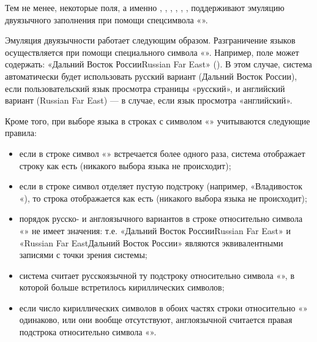 \documentclass[letterpaper,10pt,russian]{sphinxmanual}
\begin{document}
Тем не менее, некоторые поля, а именно {\hyperref[\detokenize{main:id23}]{}}, {\hyperref[\detokenize{main:id24}]{}}, {\hyperref[\detokenize{main:id25}]{}}, {\hyperref[\detokenize{main:id26}]{}}, {\hyperref[\detokenize{main:id28}]{}}, {\hyperref[\detokenize{main:id35}]{}},
{\hyperref[\detokenize{main:id16}]{}} поддерживают эмуляцию двуязычного заполнения при помощи спецсимвола «\textbar{}».

Эмуляция двуязычности работает следующим образом. Разграничение языков осуществляется при помощи специального символа «\textbar{}».
Например, поле {\hyperref[\detokenize{main:id24}]{}} может содержать: «Дальний Восток России\textbar{}Russian Far East»
().
В этом случае, система автоматически будет использовать русский вариант (Дальний Восток России),
если пользовательский язык просмотра страницы «русский», и английский вариант (Russian Far East)
— в случае, если язык просмотра «английский».

Кроме того, при выборе языка в строках с символом «\textbar{}» учитываются следующие правила:
\begin{itemize}
\item {} 
если в строке символ «\textbar{}» встречается более одного раза, система отображает
строку как есть (никакого выбора языка не происходит);

\item {} 
если в строке символ отделяет пустую подстроку (например, «Владивосток\textbar{}   «),
то строка отображается как есть (никакого выбора языка не происходит);

\item {} 
порядок русско- и англоязычного вариантов в строке относительно символа «\textbar{}» не
имеет значения: т.е. «Дальний Восток России\textbar{}Russian Far East» и
«Russian Far East\textbar{}Дальний Восток России» являются эквивалентными записями с точки зрения системы;

\item {} 
система считает русскоязычной ту подстроку относительно символа «\textbar{}»,
в которой больше встретилось кириллических символов;

\item {} 
если число кириллических символов в обоих частях строки относительно «\textbar{}»
одинаково, или они вообще отсутствуют, англоязычной считается правая
подстрока относительно символа «\textbar{}».

\end{itemize}
\end{document}
